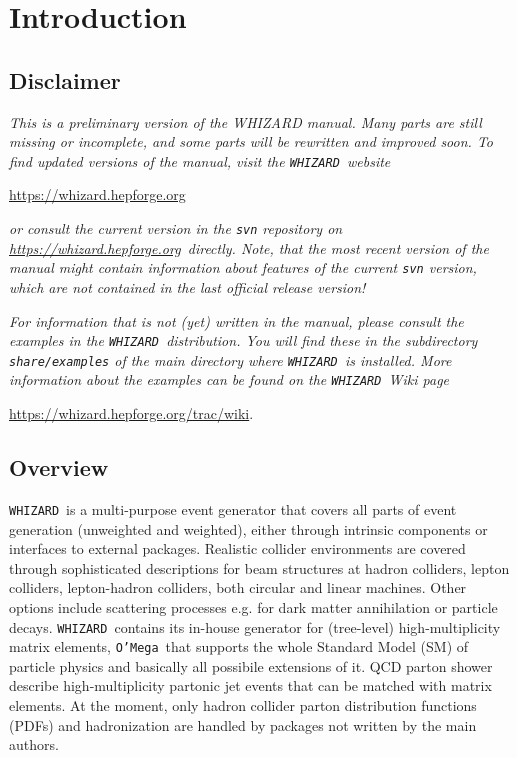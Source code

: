 \documentclass[12pt]{book}
\newcommand{\hepforgepage}{\url{https://whizard.hepforge.org}}
\newcommand{\whizardwiki}{\url{https://whizard.hepforge.org/trac/wiki}}
\newcommand{\ttt}[1]{\texttt{#1}}
\newcommand{\whizard}{\ttt{WHIZARD}}
\newcommand{\oMega}{\ttt{O'Mega}}
\begin{document}
\tableofcontents

\newpage
\chapter{Introduction}

\section{Disclaimer}

\emph{This is a preliminary version of the WHIZARD manual.  Many parts
  are still missing or incomplete, and some parts will be rewritten and
  improved soon.  To find updated versions of the manual,
  visit the \whizard\ website}
\begin{center}
  \hepforgepage
\end{center}
\emph{or consult the current version in the \ttt{svn} repository
  on \hepforgepage\ directly. Note, that the most recent version of
  the manual might contain information about features of the
  current \ttt{svn} version, which are not contained in the last
  official release version!}

\emph{For information that is not (yet) written in the manual, please
consult the examples in the \whizard\ distribution.  You will find these in
the subdirectory \ttt{share/examples} of the main directory where
\whizard\ is installed. More information about the examples can be
found on the \whizard\ Wiki page}
\begin{center}
  \whizardwiki .
\end{center}


\clearpage
\section{Overview}

\whizard\ is a multi-purpose event generator that covers all parts of
event generation (unweighted and weighted), either through intrinsic
components or interfaces to external packages. Realistic collider
environments are covered through sophisticated descriptions for beam
structures at hadron colliders, lepton colliders, lepton-hadron
colliders, both circular and linear machines. Other options include
scattering processes e.g. for dark matter annihilation or particle
decays. \whizard\ contains its in-house generator for (tree-level)
high-multiplicity matrix elements, \oMega\, that supports the whole
Standard Model (SM) of particle physics and basically all possibile
extensions of it. QCD parton shower describe high-multiplicity
partonic jet events that can be matched with matrix elements. At the
moment, only hadron collider parton distribution functions (PDFs) and
hadronization are handled by packages not written by the main
authors.
\end{document}
